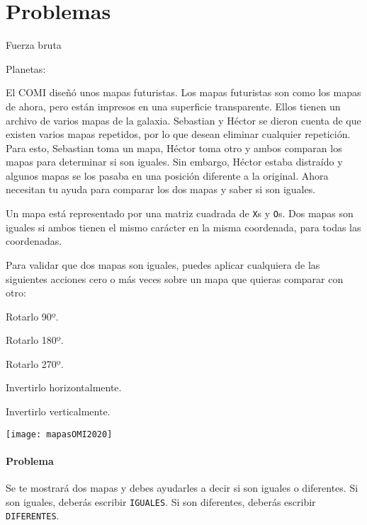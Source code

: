 \chapter*{Problemas}
\startproblemlist
\renewcommand{\problemgroup}{E}
 \problembreak
 
\problemtitle Fuerza bruta
 
 \problembreak
 
\problemtitle Planetas: 
 
 
 
  \problembreak
  
\problemtitle El COMI diseñó unos mapas futuristas. Los mapas futuristas son como los mapas de ahora, pero están impresos en una superficie transparente. Ellos tienen un archivo de varios mapas de la galaxia. Sebastian y Héctor se dieron cuenta de que existen varios mapas repetidos, por lo que desean eliminar cualquier repetición. Para esto, Sebastian toma un mapa, Héctor toma otro y ambos comparan los mapas para determinar si son iguales. Sin embargo, Héctor estaba distraído y algunos mapas se los pasaba en una posición diferente a la original. Ahora necesitan tu ayuda para comparar los dos mapas y saber si son iguales.
 
 Un mapa está representado por una matriz cuadrada de \verb|X|s y \verb|O|s. Dos mapas son iguales si ambos tienen el mismo carácter en la misma coordenada, para todas las coordenadas.
 
 Para validar que dos mapas son iguales, puedes aplicar cualquiera de las siguientes acciones cero o más veces sobre un mapa que quieras comparar con otro:
 \begin{plimits}
 	\item Rotarlo 90º.
 	\item Rotarlo 180º.
 	\item Rotarlo 270º.
 	\item Invertirlo horizontalmente.
 	\item Invertirlo verticalmente.
 \end{plimits}
 \begin{center}
 	\texttt{[image: mapasOMI2020]}
 \end{center}
 
 \subsubsection*{Problema}
 Se te mostrará dos mapas y debes ayudarles a decir si son iguales o diferentes. Si son iguales, deberás escribir \verb|IGUALES|. Si son diferentes, deberás escribir \verb|DIFERENTES|.
 
